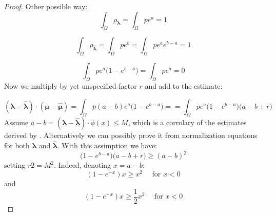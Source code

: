 \documentclass{article}
\def\vc#1{\mathbf{\boldsymbol{#1}}}     %
\def\R{\mathbf{R}}
\def\vl{{\vc\lambda}}
\def\estvl{{\vc{\hat\lambda}}}
\def\vmu{\vc\mu}
\def\estvmu{{\vc{\hat\mu}}}
\def\vphi{\vc\phi}
\begin{document}
\begin{proof}
 
Other possible way:
\[
   \int_\Omega \rho_{\vl} = \int_{\Omega} p e^a = 1
\]

\[
 \int_\Omega \rho_{\estvl} = \int_{\Omega} p e^b  = \int_{\Omega} p e^a e^{b-a}  = 1
\]

\[
   \int_\Omega p e^a \Big(1 - e^{b-a}\Big) = \int_{\Omega} p e^a = 0
\]
Now we multiply by yet unspecified factor $r$ and add to the estimate:

\[
  (\vl - \estvl)\cdot(\vmu - \estvmu) 
      = \int_{\Omega} p (a - b) e^a\Big(1 - e^{b-a}\Big) =
      = \int_{\Omega} p e^a\Big(1 - e^{b-a}\Big)\Big(a - b + r\Big)
\]
Assume $a-b = (\vl-\estvl) \cdot \phi(x) \le M$, which is a corrolary of the estimates
derived by \cite{Barron1991}. Alternatively we can possibly prove it from normalization equations for both $\vl$ and $\estvl$. With this assimption we have:
\[
 \Big(1 - e^{b-a}\Big)\Big(a - b + r\Big) \ge (a-b)^2
\]
setting $r 2= M^2$. Indeed, denoting $x=a-b$:
\[
  (1 - e^{-x})x \ge x^2\quad\text{ for } x<0
\]
and 
\[
  (1 - e^{-x})x \ge \frac12 x^2\quad\text{ for } x<0
\]


 


% 
% 
%  
% 
% 
% 
% 
%  
% 
%  
 

\end{proof}
\end{document}
